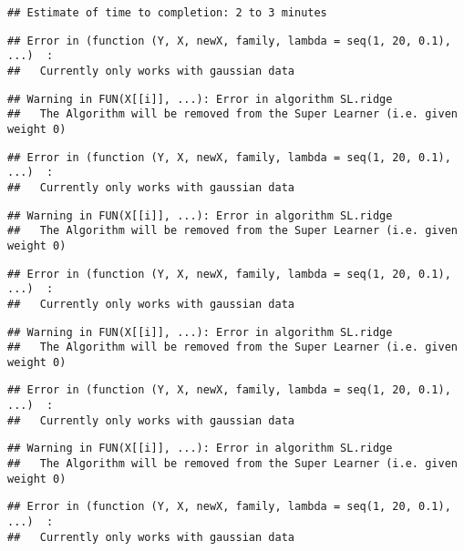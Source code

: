 \documentclass[
]{article}
\begin{document}
\begin{verbatim}
## Estimate of time to completion: 2 to 3 minutes
\end{verbatim}

\begin{verbatim}
## Error in (function (Y, X, newX, family, lambda = seq(1, 20, 0.1), ...)  : 
##   Currently only works with gaussian data
\end{verbatim}

\begin{verbatim}
## Warning in FUN(X[[i]], ...): Error in algorithm SL.ridge 
##   The Algorithm will be removed from the Super Learner (i.e. given weight 0)
\end{verbatim}

\begin{verbatim}
## Error in (function (Y, X, newX, family, lambda = seq(1, 20, 0.1), ...)  : 
##   Currently only works with gaussian data
\end{verbatim}

\begin{verbatim}
## Warning in FUN(X[[i]], ...): Error in algorithm SL.ridge 
##   The Algorithm will be removed from the Super Learner (i.e. given weight 0)
\end{verbatim}

\begin{verbatim}
## Error in (function (Y, X, newX, family, lambda = seq(1, 20, 0.1), ...)  : 
##   Currently only works with gaussian data
\end{verbatim}

\begin{verbatim}
## Warning in FUN(X[[i]], ...): Error in algorithm SL.ridge 
##   The Algorithm will be removed from the Super Learner (i.e. given weight 0)
\end{verbatim}

\begin{verbatim}
## Error in (function (Y, X, newX, family, lambda = seq(1, 20, 0.1), ...)  : 
##   Currently only works with gaussian data
\end{verbatim}

\begin{verbatim}
## Warning in FUN(X[[i]], ...): Error in algorithm SL.ridge 
##   The Algorithm will be removed from the Super Learner (i.e. given weight 0)
\end{verbatim}

\begin{verbatim}
## Error in (function (Y, X, newX, family, lambda = seq(1, 20, 0.1), ...)  : 
##   Currently only works with gaussian data
\end{verbatim}
\end{document}
